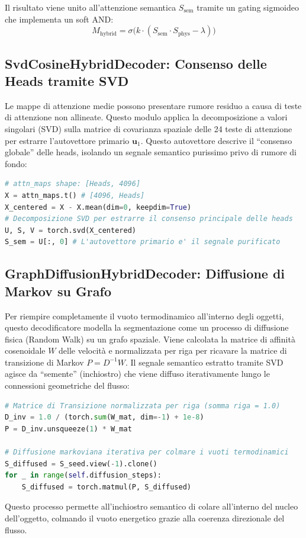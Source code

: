 \documentclass[12pt,a4paper]{report}
\begin{document}
Il risultato viene unito all'attenzione semantica $S_{\text{sem}}$ tramite un gating sigmoideo che implementa un soft AND:
\begin{equation}
    M_{\text{hybrid}} = \sigma\Big( k \cdot (S_{\text{sem}} \cdot S_{\text{phys}} - \lambda) \Big)
\end{equation}

\subsection{SvdCosineHybridDecoder: Consenso delle Heads tramite SVD}
Le mappe di attenzione medie possono presentare rumore residuo a causa di teste di attenzione non allineate. Questo modulo applica la decomposizione a valori singolari (SVD) sulla matrice di covarianza spaziale delle 24 teste di attenzione per estrarre l'autovettore primario $\mathbf{u}_1$. Questo autovettore descrive il ``consenso globale'' delle heads, isolando un segnale semantico purissimo privo di rumore di fondo:

\begin{lstlisting}[language=Python]
# attn_maps shape: [Heads, 4096]
X = attn_maps.t() # [4096, Heads]
X_centered = X - X.mean(dim=0, keepdim=True)
# Decomposizione SVD per estrarre il consenso principale delle heads
U, S, V = torch.svd(X_centered)
S_sem = U[:, 0] # L'autovettore primario e' il segnale purificato
\end{lstlisting}

\subsection{GraphDiffusionHybridDecoder: Diffusione di Markov su Grafo}
Per riempire completamente il vuoto termodinamico all'interno degli oggetti, questo decodificatore modella la segmentazione come un processo di diffusione fisica (Random Walk) su un grafo spaziale. 
Viene calcolata la matrice di affinità cosenoidale $W$ delle velocità e normalizzata per riga per ricavare la matrice di transizione di Markov $P = D^{-1}W$. Il segnale semantico estratto tramite SVD agisce da ``semente'' (inchiostro) che viene diffuso iterativamente lungo le connessioni geometriche del flusso:
\begin{lstlisting}[language=Python]
# Matrice di Transizione normalizzata per riga (somma riga = 1.0)
D_inv = 1.0 / (torch.sum(W_mat, dim=-1) + 1e-8)
P = D_inv.unsqueeze(1) * W_mat

# Diffusione markoviana iterativa per colmare i vuoti termodinamici
S_diffused = S_seed.view(-1).clone()
for _ in range(self.diffusion_steps):
    S_diffused = torch.matmul(P, S_diffused)
\end{lstlisting}
Questo processo permette all'inchiostro semantico di colare all'interno del nucleo dell'oggetto, colmando il vuoto energetico grazie alla coerenza direzionale del flusso.
\end{document}
